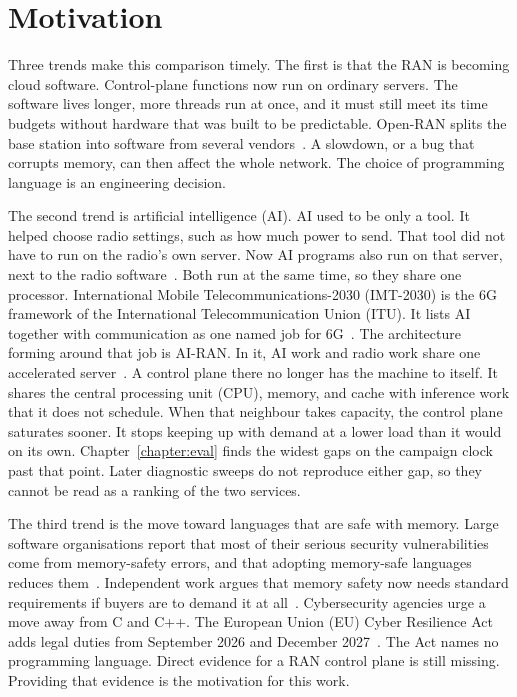\documentclass[english,oneside,a4paper,censored,csm,software-track-2020]{HYthesisML}
\begin{document}
\section{Motivation}\label{sec:motivation}
Three trends make this comparison timely.
The first is that the RAN is becoming cloud software.
Control-plane functions now run on ordinary servers.
The software lives longer, more threads run at once, and it must still meet its time budgets without hardware that was built to be predictable.
Open-RAN splits the base station into software from several vendors~\cite{polese2023oran}.
A slowdown, or a bug that corrupts memory, can then affect the whole network.
The choice of programming language is an engineering decision.

The second trend is artificial intelligence (AI).
AI used to be only a tool. It helped choose radio settings, such as how much power to send.
That tool did not have to run on the radio's own server.
Now AI programs also run on that server, next to the radio software~\cite{polese2026airan}.
Both run at the same time, so they share one processor.
International Mobile Telecommunications-2030 (IMT-2030) is the 6G framework of the International Telecommunication Union (ITU).
It lists AI together with communication as one named job for 6G~\cite{itu2023imt2030}.
The architecture forming around that job is AI-RAN. In it, AI work and radio work share one accelerated server~\cite{airan2026orchestrator}.
A control plane there no longer has the machine to itself.
It shares the central processing unit (CPU), memory, and cache with inference work that it does not schedule.
When that neighbour takes capacity, the control plane saturates sooner.
It stops keeping up with demand at a lower load than it would on its own.
Chapter~\ref{chapter:eval} finds the widest gaps on the campaign clock past that point.
Later diagnostic sweeps do not reproduce either gap, so they cannot be read as a ranking of the two services.

The third trend is the move toward languages that are safe with memory.
Large software organisations report that most of their serious security vulnerabilities come from memory-safety errors, and that adopting memory-safe languages reduces them~\cite{msrc2019memory,google2022android,vanderstoep2025android,google2024securebydesign}.
Independent work argues that memory safety now needs standard requirements if buyers are to demand it at all~\cite{watson2025memorysafety}.
Cybersecurity agencies urge a move away from C and C++.
The European Union (EU) Cyber Resilience Act adds legal duties from September 2026 and December 2027~\cite{cisa2023memorysafe,oncd2024building,eu2024cra}.
The Act names no programming language.
Direct evidence for a RAN control plane is still missing.
Providing that evidence is the motivation for this work.
\end{document}
